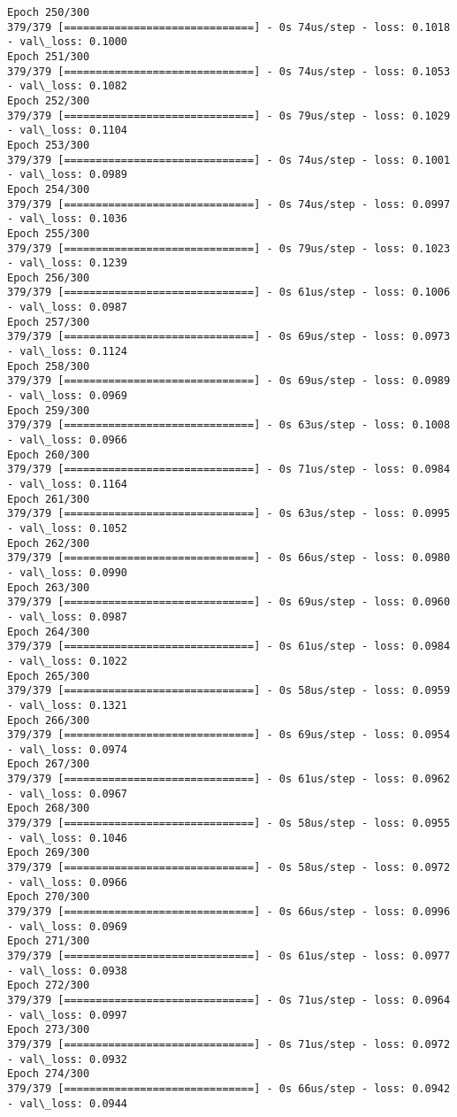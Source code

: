\documentclass[11pt]{article}
\begin{document}
\begin{Verbatim}[commandchars=\\\{\}]
Epoch 250/300
379/379 [==============================] - 0s 74us/step - loss: 0.1018 - val\_loss: 0.1000
Epoch 251/300
379/379 [==============================] - 0s 74us/step - loss: 0.1053 - val\_loss: 0.1082
Epoch 252/300
379/379 [==============================] - 0s 79us/step - loss: 0.1029 - val\_loss: 0.1104
Epoch 253/300
379/379 [==============================] - 0s 74us/step - loss: 0.1001 - val\_loss: 0.0989
Epoch 254/300
379/379 [==============================] - 0s 74us/step - loss: 0.0997 - val\_loss: 0.1036
Epoch 255/300
379/379 [==============================] - 0s 79us/step - loss: 0.1023 - val\_loss: 0.1239
Epoch 256/300
379/379 [==============================] - 0s 61us/step - loss: 0.1006 - val\_loss: 0.0987
Epoch 257/300
379/379 [==============================] - 0s 69us/step - loss: 0.0973 - val\_loss: 0.1124
Epoch 258/300
379/379 [==============================] - 0s 69us/step - loss: 0.0989 - val\_loss: 0.0969
Epoch 259/300
379/379 [==============================] - 0s 63us/step - loss: 0.1008 - val\_loss: 0.0966
Epoch 260/300
379/379 [==============================] - 0s 71us/step - loss: 0.0984 - val\_loss: 0.1164
Epoch 261/300
379/379 [==============================] - 0s 63us/step - loss: 0.0995 - val\_loss: 0.1052
Epoch 262/300
379/379 [==============================] - 0s 66us/step - loss: 0.0980 - val\_loss: 0.0990
Epoch 263/300
379/379 [==============================] - 0s 69us/step - loss: 0.0960 - val\_loss: 0.0987
Epoch 264/300
379/379 [==============================] - 0s 61us/step - loss: 0.0984 - val\_loss: 0.1022
Epoch 265/300
379/379 [==============================] - 0s 58us/step - loss: 0.0959 - val\_loss: 0.1321
Epoch 266/300
379/379 [==============================] - 0s 69us/step - loss: 0.0954 - val\_loss: 0.0974
Epoch 267/300
379/379 [==============================] - 0s 61us/step - loss: 0.0962 - val\_loss: 0.0967
Epoch 268/300
379/379 [==============================] - 0s 58us/step - loss: 0.0955 - val\_loss: 0.1046
Epoch 269/300
379/379 [==============================] - 0s 58us/step - loss: 0.0972 - val\_loss: 0.0966
Epoch 270/300
379/379 [==============================] - 0s 66us/step - loss: 0.0996 - val\_loss: 0.0969
Epoch 271/300
379/379 [==============================] - 0s 61us/step - loss: 0.0977 - val\_loss: 0.0938
Epoch 272/300
379/379 [==============================] - 0s 71us/step - loss: 0.0964 - val\_loss: 0.0997
Epoch 273/300
379/379 [==============================] - 0s 71us/step - loss: 0.0972 - val\_loss: 0.0932
Epoch 274/300
379/379 [==============================] - 0s 66us/step - loss: 0.0942 - val\_loss: 0.0944

\end{Verbatim}
\end{document}
